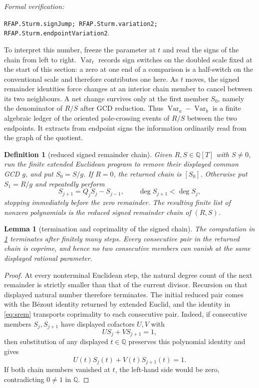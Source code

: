 \documentclass[11pt]{article}
\newtheorem{lemma}[theorem]{Lemma}
\newtheorem{definition}[theorem]{Definition}
\newcommand{\Q}{\mathbb{Q}}
\newcommand{\Var}{\operatorname{Var}}
\newcommand{\leanref}[1]{\par\smallskip\noindent
  \emph{Formal verification:}\par\nobreak
  {\raggedright\nolinkurl{#1}.\par}}
\begin{document}
\leanref{RFAP.Sturm.signJump; RFAP.Sturm.variation2;
RFAP.Sturm.endpointVariation2}

To interpret this number, freeze the parameter at $t$ and read the signs of
the chain from left to right.  $\Var_t$ records sign switches on the
doubled scale fixed at the start of this section: a zero at one end of a
comparison is a half-switch on the conventional scale and therefore
contributes one here.  As $t$ moves, the signed remainder identities force
changes at an interior chain member to
cancel between its two neighbours.  A net change survives only at the first
member $S_0$, namely the denominator of $R/S$ after GCD reduction.  Thus
$\Var_a-\Var_b$ is a finite algebraic ledger of the oriented
pole-crossing events of $R/S$ between the two endpoints.  It extracts from
endpoint signs the information ordinarily read from the graph of the
quotient.

\begin{definition}[reduced signed remainder chain]
\label{def:reduced-signed-remainder-chain}
Given $R,S\in\Q[T]$ with $S\ne0$, run the finite extended Euclidean program
to remove their displayed common GCD $g$, and put $S_0=S/g$.  If $R=0$,
the returned chain is $[S_0]$.  Otherwise put $S_1=R/g$ and repeatedly
perform
\begin{equation}
\label{eq:srem}
       S_{j+1}=Q_jS_j-S_{j-1},\qquad \deg S_{j+1}<\deg S_j,
\end{equation}
stopping immediately before the zero remainder.  The resulting finite list
of nonzero polynomials is the \emph{reduced signed remainder chain} of
$(R,S)$.
\end{definition}

\begin{lemma}[termination and coprimality of the signed chain]
\label{lem:signed-chain-termination}
The computation in \cref{def:reduced-signed-remainder-chain} terminates after
finitely many steps.  Every consecutive pair in the returned chain is
coprime, and hence no two consecutive members can vanish at the same
displayed rational parameter.
\end{lemma}

\begin{proof}
At every nonterminal Euclidean step, the natural degree count of the next
remainder is strictly smaller than that of the current divisor.  Recursion
on that displayed natural number therefore terminates.  The initial reduced
pair comes with the B\'ezout identity returned by extended Euclid, and the
identity in \eqref{eq:srem} transports coprimality to each consecutive pair.
Indeed, if consecutive members $S_j,S_{j+1}$ have displayed cofactors $U,V$
with
\[
                       US_j+VS_{j+1}=1,
\]
then substitution of any displayed $t\in\Q$ preserves this polynomial
identity and gives
\[
             U(t)S_j(t)+V(t)S_{j+1}(t)=1.
\]
If both chain members vanished at $t$, the left-hand side would be zero,
contradicting $0\ne1$ in $\Q$.
\end{proof}
\end{document}
